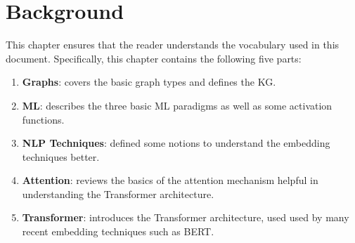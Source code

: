 
\chapter{Background}
\label{chap:background}

This chapter ensures that the reader understands the vocabulary used in this
document. Specifically, this chapter contains the following five parts:

\begin{multicols}{2}
  \begin{enumerate}
  \item \textbf{Graphs}: covers the basic graph types and defines the KG.
  \item \textbf{ML}: describes the three basic ML paradigms as well as some
    activation functions.
  \item \textbf{NLP Techniques}: defined some notions to understand the
    embedding techniques better.
    \columnbreak
  \item \textbf{Attention}: reviews the basics of the attention mechanism
    helpful in understanding the Transformer architecture.
  \item \textbf{Transformer}: introduces the Transformer architecture, used used
    by many recent embedding techniques such as BERT.
  \end{enumerate}
\end{multicols}







